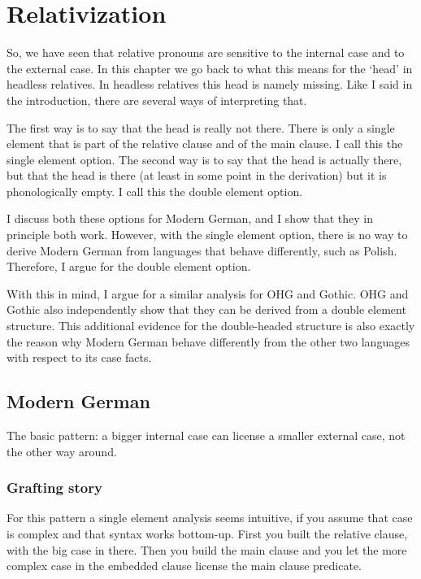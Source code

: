 
\chapter{Relativization}\label{ch:relativization}

So, we have seen that relative pronouns are sensitive to the internal case and to the external case. In this chapter we go back to what this means for the `head' in headless relatives. In headless relatives this head is namely missing. Like I said in the introduction, there are several ways of interpreting that.

The first way is to say that the head is really not there. There is only a single element that is part of the relative clause and of the main clause. I call this the single element option. The second way is to say that the head is actually there, but that the head is there (at least in some point in the derivation) but it is phonologically empty. I call this the double element option.

I discuss both these options for Modern German, and I show that they in principle both work. However, with the single element option, there is no way to derive Modern German from languages that behave differently, such as Polish. Therefore, I argue for the double element option.

With this in mind, I argue for a similar analysis for OHG and Gothic. OHG and Gothic also independently show that they can be derived from a double element structure. This additional evidence for the double-headed structure is also exactly the reason why Modern German behave differently from the other two languages with respect to its case facts.




\section{Modern German}

The basic pattern: a bigger internal case can license a smaller external case, not the other way around.

\subsection{Grafting story}

For this pattern a single element analysis seems intuitive, if you assume that case is complex and that syntax works bottom-up. First you built the relative clause, with the big case in there. Then you build the main clause and you let the more complex case in the embedded clause license the main clause predicate.

